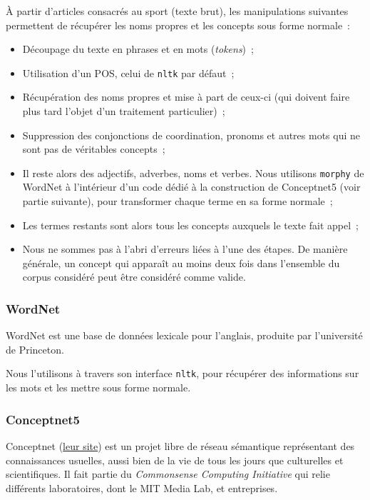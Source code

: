 \documentclass[a4paper, 12pt]{article}
\newcommand{\pyt}[1]{\texttt{#1}}%
\newcommand{\ang}[1]{\textit{#1}}%
\begin{document}
\`A partir d'articles consacrés au sport (texte brut), les manipulations suivantes permettent de récupérer les noms propres et les concepts sous forme normale~:
\begin{itemize}
 \item Découpage du texte en phrases et en mots (\textit{tokens})~;
 \item Utilisation d'un POS, celui de \pyt{nltk} par défaut~;
 \item Récupération des noms propres et mise à part de ceux-ci (qui doivent faire plus tard l'objet d'un traitement particulier)~;
 \item Suppression des conjonctions de coordination, pronoms et autres mots qui ne sont pas de véritables concepts~;
 \item Il reste alors des adjectifs, adverbes, noms et verbes. Nous utilisons \pyt{morphy} de WordNet à l'intérieur d'un code dédié à la construction de Conceptnet5 (voir partie suivante), pour transformer chaque terme en sa forme normale~;
 \item Les termes restants sont alors tous les concepts auxquels le texte fait appel~;
 \item Nous ne sommes pas à l'abri d'erreurs liées à l'une des étapes. De manière générale, un concept qui apparaît au moins deux fois dans l'ensemble du corpus considéré peut être considéré comme valide.
\end{itemize}


\subsubsection{WordNet}

WordNet est une base de données lexicale pour l'anglais, produite par l'université de Princeton.

Nous l'utilisons à travers son interface \pyt{nltk}, pour récupérer des informations sur les mots et les mettre sous forme normale.


\subsubsection{Conceptnet5}

Conceptnet (\href{http://conceptnet5.media.mit.edu/}{leur site}) est un projet libre de réseau sémantique représentant des connaissances usuelles, aussi bien de la vie de tous les jours que culturelles et scientifiques. Il fait partie du \ang{Commonsense Computing Initiative} qui relie différents laboratoires, dont le MIT Media Lab, et entreprises.
\end{document}
